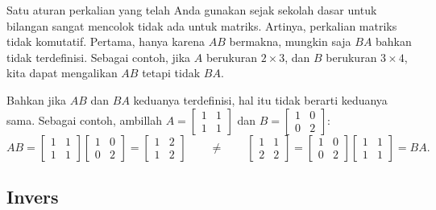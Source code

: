 Satu aturan perkalian yang telah Anda gunakan sejak sekolah dasar untuk bilangan
sangat mencolok tidak ada untuk matriks.
Artinya, perkalian matriks
tidak komutatif. Pertama, hanya karena $AB$ bermakna, mungkin saja
$BA$ bahkan tidak terdefinisi. Sebagai contoh, jika $A$ berukuran $2 \times 3$, dan
$B$ berukuran $3 \times 4$, kita dapat mengalikan $AB$ tetapi tidak $BA$.

Bahkan jika $AB$ dan $BA$ keduanya terdefinisi, hal itu tidak berarti keduanya sama.
Sebagai contoh, ambillah
$A = \left[ \begin{smallmatrix} 1 & 1 \\ 1 & 1 \end{smallmatrix} \right]$
dan
$B = \left[ \begin{smallmatrix} 1 & 0 \\ 0 & 2 \end{smallmatrix} \right]$:
\begin{equation*}
AB =
\begin{bmatrix} 1 & 1 \\ 1 & 1 \end{bmatrix}
\begin{bmatrix} 1 & 0 \\ 0 & 2 \end{bmatrix}
=
\begin{bmatrix} 1 & 2 \\ 1 & 2 \end{bmatrix}
\qquad
\neq
\qquad
\begin{bmatrix} 1 & 1 \\ 2 & 2 \end{bmatrix}
=
\begin{bmatrix} 1 & 0 \\ 0 & 2 \end{bmatrix}
\begin{bmatrix} 1 & 1 \\ 1 & 1 \end{bmatrix}
=
BA .
\end{equation*}

\subsection{Invers}

